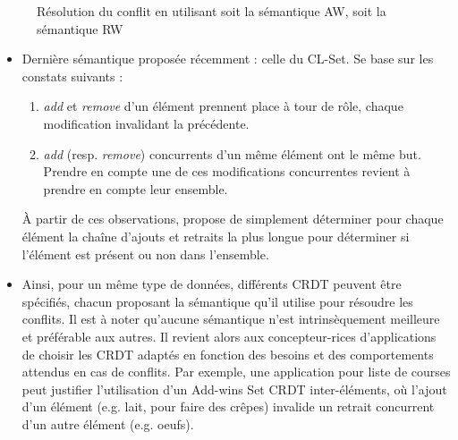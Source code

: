 \documentclass[12pt]{thesul}
\newcommand{\eg}{e.g. }
\newcommand{\trm}[1]{\mathit{#1}}
\begin{document}
\begin{figure}[!ht]
{\begin{minipage}{\columnwidth}
{
          \label{fig:set-rw}}
      \end{minipage}}
  \caption{Résolution du conflit en utilisant soit la sémantique \ac{AW}, soit la sémantique \ac{RW}}
  \label{fig:set-aw-rw}
\end{figure}

\begin{itemize}
  \item Dernière sémantique proposée récemment : celle du CL-Set.
    Se base sur les constats suivants :
    \begin{enumerate}[label=(\roman*)]
      \item \emph{add} et \emph{remove} d'un élément prennent place à tour de rôle, chaque modification invalidant la précédente.
      \item \emph{add} (resp. \emph{remove}) concurrents d'un même élément ont le même but.
        Prendre en compte une de ces modifications concurrentes revient à prendre en compte leur ensemble.
    \end{enumerate}
    À partir de ces observations, propose de simplement déterminer pour chaque élément la chaîne d'ajouts et retraits la plus longue pour déterminer si l'élément est présent ou non dans l'ensemble.
  \item Ainsi, pour un même type de données, différents \ac{CRDT} peuvent être spécifiés, chacun proposant la sémantique qu'il utilise pour résoudre les conflits.
    Il est à noter qu'aucune sémantique n'est intrinsèquement meilleure et préférable aux autres.
    Il revient alors aux concepteur-rices d'applications de choisir les \ac{CRDT} adaptés en fonction des besoins et des comportements attendus en cas de conflits.
    Par exemple, une application pour liste de courses peut justifier l'utilisation d'un Add-wins Set \ac{CRDT} inter-éléments, où l'ajout d'un élément (\eg lait, pour faire des crêpes) invalide un retrait concurrent d'un autre élément (\eg oeufs).
\end{itemize}
\end{document}
